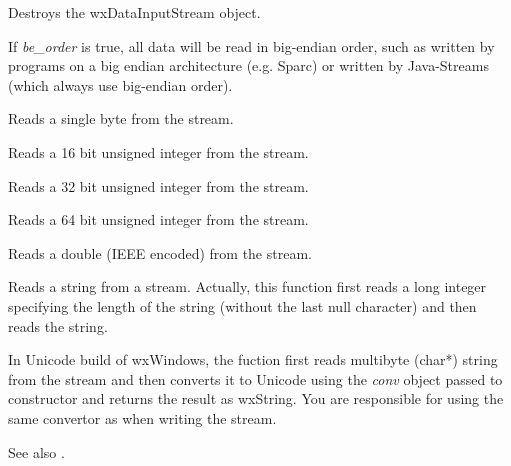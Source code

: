 




Destroys the wxDataInputStream object.



If {\it be\_order} is true, all data will be read in big-endian
order, such as written by programs on a big endian architecture 
(e.g. Sparc) or written by Java-Streams (which always use 
big-endian order).
  


Reads a single byte from the stream.



Reads a 16 bit unsigned integer from the stream.



Reads a 32 bit unsigned integer from the stream.



Reads a 64 bit unsigned integer from the stream.



Reads a double (IEEE encoded) from the stream.

\label{wxdatainputstreamreadstring}


Reads a string from a stream. Actually, this function first reads a long 
integer specifying the length of the string (without the last null character) 
and then reads the string.

In Unicode build of wxWindows, the fuction first reads multibyte (char*)
string from the stream and then converts it to Unicode using the {\it conv}
object passed to constructor and returns the result as wxString. You are
responsible for using the same convertor as when writing the stream.

See also .

